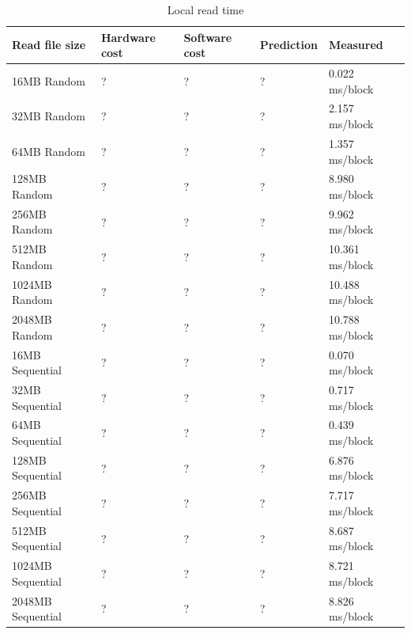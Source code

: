 \begin{table}[h]
\begin{center}
\begin{tabular}{| l | l | l | l | l |}
\hline
Read file size & Hardware cost & Software cost & Prediction & Measured \\ \hline

16MB Random		& ?		& ?       & ?        & 0.022  ms/block \\ \hline
32MB Random		& ?		& ?       & ?        & 2.157  ms/block \\ \hline
64MB Random		& ?		& ?       & ?        & 1.357  ms/block \\ \hline
128MB Random 		& ?		& ?       & ?        & 8.980  ms/block \\ \hline
256MB Random		& ?		& ?       & ?        & 9.962  ms/block \\ \hline
512MB Random		& ?		& ?       & ?        & 10.361  ms/block \\ \hline
1024MB Random		& ?		& ?       & ?        & 10.488  ms/block \\ \hline
2048MB Random		& ?		& ?       & ?        & 10.788  ms/block \\ \hline\hline

16MB Sequential		& ?		& ?       & ?        & 0.070   ms/block \\ \hline
32MB Sequential		& ?		& ?       & ?        & 0.717   ms/block \\ \hline
64MB Sequential		& ?		& ?       & ?        & 0.439   ms/block \\ \hline
128MB Sequential 	& ?		& ?       & ?        & 6.876   ms/block \\ \hline
256MB Sequential	& ?		& ?       & ?        & 7.717   ms/block \\ \hline
512MB Sequential	& ?		& ?       & ?        & 8.687   ms/block \\ \hline
1024MB Sequential	& ?		& ?       & ?        & 8.721   ms/block \\ \hline
2048MB Sequential	& ?		& ?       & ?        & 8.826   ms/block \\ \hline\hline

\end{tabular}
\end{center}
\caption{Local read time\label{tab:file-read-time}}
\end{table}

